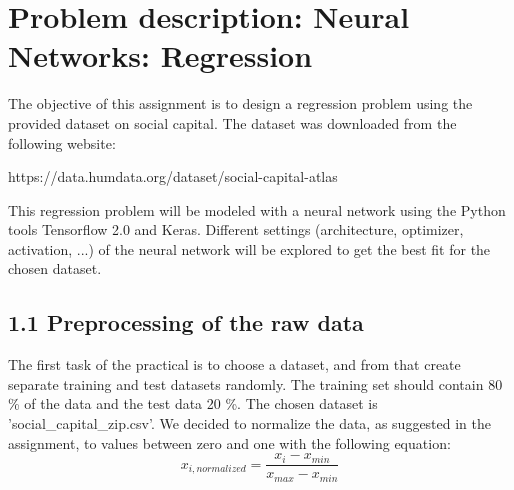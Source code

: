 
\section{Problem description: Neural Networks: Regression}
The objective of this assignment is to design a regression problem using the provided dataset on social capital. The dataset was downloaded from the following website:

https://data.humdata.org/dataset/social-capital-atlas

This regression problem will be modeled with a neural network using the Python tools Tensorflow 2.0 and Keras. Different settings (architecture, optimizer, activation, ...) of the neural network will be explored to get the best fit for the chosen dataset.

\subsection*{1.1 Preprocessing of the raw data}

The first task of the practical is to choose a dataset, and from that create separate training and test datasets randomly. The training set should contain 80 \% of the data and the test data 20 \%. The chosen dataset is ’social\_capital\_zip.csv’. We decided to normalize the data, as suggested in the assignment, to values between zero and one with the following equation:
\[x_{i,normalized} = \frac{x_{i}-x_{min}}{x_{max}-x_{min}}\]

